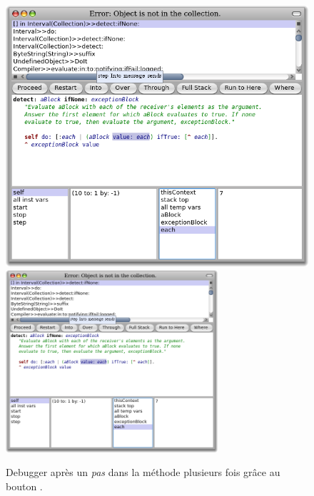 \documentclass[a4paper,10pt,twoside]{book}
\begin{document}
\begin{figure}[btp]
	\begin{center}
	\ifluluelse
		{\includegraphics[width=\textwidth]{steppingIntoValue}}
		{\includegraphics[width=0.7\textwidth]{steppingIntoValue}}
	\end{center}
	\caption{Debugger après un \emph{pas} dans la méthode 
      plusieurs fois grâce au bouton .}
\end{figure}
\end{document}
